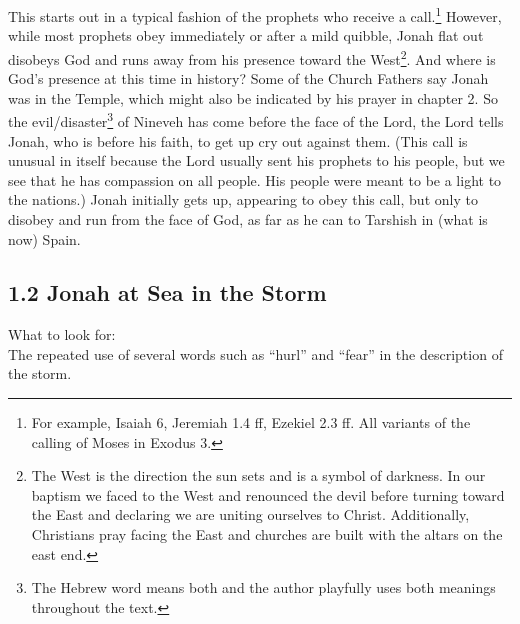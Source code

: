 \documentclass[
]{article}
\begin{document}
This starts out in a typical fashion of the prophets who receive a
call.\footnote{For example, Isaiah 6, Jeremiah 1.4 ff, Ezekiel 2.3 ff.
  All variants of the calling of Moses in Exodus 3.} However, while most
prophets obey immediately or after a mild quibble, Jonah flat out
disobeys God and runs away from his presence toward the West\footnote{The
  West is the direction the sun sets and is a symbol of darkness. In our
  baptism we faced to the West and renounced the devil before turning
  toward the East and declaring we are uniting ourselves to Christ.
  Additionally, Christians pray facing the East and churches are built
  with the altars on the east end.}. And where is God's presence at this
time in history? Some of the Church Fathers say Jonah was in the Temple,
which might also be indicated by his prayer in chapter 2. So the
evil/disaster\footnote{The Hebrew word means both and the author
  playfully uses both meanings throughout the text.} of Nineveh has come
before the face of the Lord, the Lord tells Jonah, who is before his
faith, to get up cry out against them. (This call is unusual in itself
because the Lord usually sent his prophets to his people, but we see
that he has compassion on all people. His people were meant to be a
light to the nations.) Jonah initially gets up, appearing to obey this
call, but only to disobey and run from the face of God, as far as he can
to Tarshish in (what is now) Spain.

\subsection{1.2 Jonah at Sea in the
Storm}\label{jonah-at-sea-in-the-storm}

What to look for:\\
The repeated use of several words such as ``hurl'' and ``fear'' in the
description of the storm.
\end{document}
